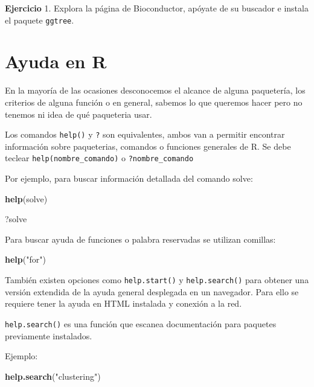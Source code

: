 \documentclass[
]{book}
\newenvironment{Shaded}{\begin{snugshade}}{\end{snugshade}}
\newcommand{\FunctionTok}[1]{\textcolor[rgb]{0.13,0.29,0.53}{\textbf{#1}}}
\newcommand{\NormalTok}[1]{#1}
\newcommand{\StringTok}[1]{\textcolor[rgb]{0.31,0.60,0.02}{#1}}
\begin{document}
\textbf{Ejercicio}
1. Explora la página de Bioconductor, apóyate de su buscador e instala el paquete \texttt{ggtree}.

\section{Ayuda en R}\label{ayuda-en-r}

En la mayoría de las ocasiones desconocemos el alcance de alguna paquetería, los criterios de alguna función o en general, sabemos lo que queremos hacer pero no tenemos ni idea de qué paqueteria usar.

Los comandos \texttt{help()} y \texttt{?} son equivalentes, ambos van a permitir encontrar información sobre paqueterias, comandos o funciones generales de R. Se debe teclear \texttt{help(nombre\_comando)} o \texttt{?nombre\_comando}

Por ejemplo, para buscar información detallada del comando solve:

\begin{Shaded}
\begin{Highlighting}[]
\FunctionTok{help}\NormalTok{(solve)}
\end{Highlighting}
\end{Shaded}

\begin{Shaded}
\begin{Highlighting}[]
\NormalTok{?solve}
\end{Highlighting}
\end{Shaded}

Para buscar ayuda de funciones o palabra reservadas se utilizan comillas:

\begin{Shaded}
\begin{Highlighting}[]
\FunctionTok{help}\NormalTok{(}\StringTok{"for"}\NormalTok{)}
\end{Highlighting}
\end{Shaded}

También existen opciones como \texttt{help.start()} y \texttt{help.search()} para obtener una versión extendida de la ayuda general desplegada en un navegador. Para ello se requiere tener la ayuda en HTML instalada y conexión a la red.

\texttt{help.search()} es una función que escanea documentación para paquetes previamente instalados.

Ejemplo:

\begin{Shaded}
\begin{Highlighting}[]
\FunctionTok{help.search}\NormalTok{(}\StringTok{"clustering"}\NormalTok{)}
\end{Highlighting}
\end{Shaded}
\end{document}
